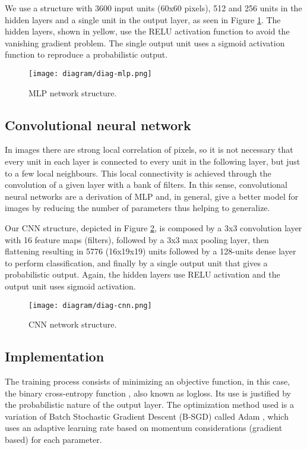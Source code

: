         We use a structure with 3600 input units (60x60 pixels), 512 and 256 units in the hidden layers and a single unit in the output layer, as seen in Figure \ref{fig:diag-mlp}. The hidden layers, shown in yellow, use the RELU \cite{nair2010relu} activation function to avoid the vanishing gradient problem. The single output unit uses a sigmoid activation function to reproduce a probabilistic output.

        \begin{figure}
        \centering
        \texttt{[image: diagram/diag-mlp.png]}
        \caption{MLP network structure.}
        \label{fig:diag-mlp}
        \end{figure}

    \subsection{Convolutional neural network}
         In images there are strong local correlation of pixels, so it is not necessary that every unit in each layer is connected to every unit in the following layer, but just to a few local neighbours. This local connectivity is achieved through the convolution of a given layer with a bank of filters. In this sense, convolutional neural networks are a derivation of MLP and, in general, give a better model for images by reducing the number of parameters thus helping to generalize.

        Our CNN structure, depicted in Figure \ref{fig:diag-cnn}, is composed by a 3x3 convolution layer with 16 feature maps (filters), followed by a 3x3 max pooling layer, then flattening resulting in 5776 (16x19x19) units followed by a 128-units dense layer to perform classification, and finally by a single output unit that gives a probabilistic output. Again, the hidden layers use RELU activation and the output unit uses sigmoid activation.

        \begin{figure}
        \centering
        \texttt{[image: diagram/diag-cnn.png]}
        \caption{CNN network structure.}
        \label{fig:diag-cnn}
        \end{figure}

    \subsection{Implementation}
        The training process consists of minimizing an objective function, in this case, the binary cross-entropy function \cite{DLbook}, also known as logloss. Its use is justified by the probabilistic nature of the output layer. The optimization method used is a variation of Batch Stochastic Gradient Descent (B-SGD) called Adam \cite{kingma2014adam}, which uses an adaptive learning rate based on momentum considerations (gradient based) for each parameter.

